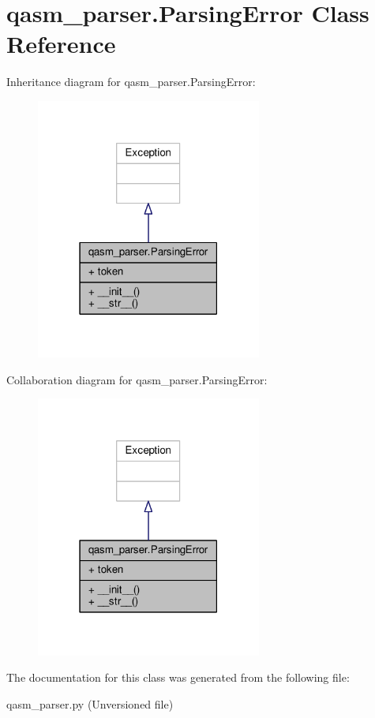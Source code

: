 \hypertarget{classqasm__parser_1_1ParsingError}{\section{qasm\-\_\-parser.\-Parsing\-Error Class Reference}
\label{classqasm__parser_1_1ParsingError}
}


Inheritance diagram for qasm\-\_\-parser.\-Parsing\-Error\-:
\nopagebreak
\begin{figure}[H]
\begin{center}
\leavevmode
\includegraphics[width=210pt]{d2/d85/classqasm__parser_1_1ParsingError__inherit__graph}
\end{center}
\end{figure}


Collaboration diagram for qasm\-\_\-parser.\-Parsing\-Error\-:
\nopagebreak
\begin{figure}[H]
\begin{center}
\leavevmode
\includegraphics[width=210pt]{dc/d97/classqasm__parser_1_1ParsingError__coll__graph}
\end{center}
\end{figure}


The documentation for this class was generated from the following file\-:\begin{DoxyCompactItemize}
\item 
qasm\-\_\-parser.\-py (\-Unversioned file)\end{DoxyCompactItemize}
